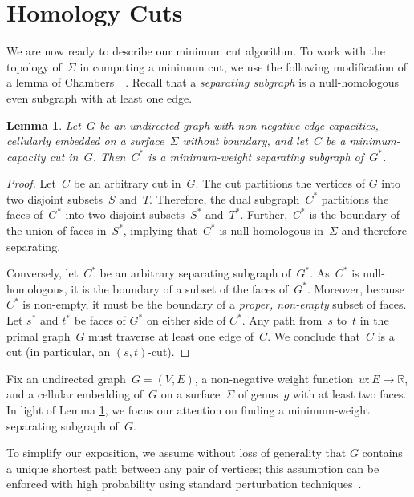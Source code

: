 \documentclass[twoside,leqno,twocolumn]{article}
\def\Real{\mathbb{R}}
\newtheorem{lemma}[theorem]{Lemma}
\begin{document}

\section{Homology Cuts}
\label{s:homology}

We are now ready to describe our minimum cut algorithm.  To work with the topology of~$\Sigma$ in computing a minimum cut, we use the following modification of a lemma of Chambers~\etal~\cite[Lemma~3.1]{cen-mcshc-09}.  Recall that a \emph{separating subgraph} is a null-homologous even subgraph with at least one edge.

\begin{lemma}
\label{L:mincut-z2}
Let~$G$ be an undirected graph with non-negative edge capacities, cellularly   embedded on a surface~$\Sigma$ without boundary, and let~$C$ be a minimum-capacity   cut in~$G$.  Then~$C^*$ is a minimum-weight separating subgraph of~$G^*$.
\end{lemma}

\begin{proof}
  Let~$C$ be an arbitrary cut in~$G$.  The cut partitions the vertices of $G$
  into two disjoint subsets~$S$ and~$T$. Therefore, the dual subgraph~$C^*$
  partitions the faces of~$G^*$ into two disjoint subsets~$S^*$ and~$T^*$.
  Further,~$C^*$ is the boundary of the union of faces in~$S^*$, implying
  that~$C^*$ is null-homologous in~$\Sigma$ and therefore separating.

  Conversely, let~$C^*$ be an arbitrary separating subgraph of~$G^*$.
  As~$C^*$ is null-homologous, it is the boundary of a subset of the faces
  of~$G^*$.  Moreover, because $C^*$ is non-empty, it must be the boundary of
  a \emph{proper, non-empty} subset of faces.  Let $s^*$ and $t^*$ be faces
  of $G^*$ on either side of $C^*$.  Any path from~$s$ to~$t$ in the primal
  graph~$G$ must traverse at least one edge of~$C$.  We conclude that~$C$ is
  a cut (in particular, an $(s,t)$-cut).
\end{proof}

Fix an undirected graph~$G=(V,E)$, a non-negative weight function~$w\colon E\to \Real$, and a cellular embedding of~$G$ on a surface~$\Sigma$ of genus~$g$ with at least two faces.  In light of Lemma \ref{L:mincut-z2}, we focus our attention on finding a minimum-weight separating subgraph of~$G$. 

To simplify our exposition, we assume without loss of generality that $G$ contains a unique shortest path between any pair of vertices; this assumption can be enforced with high probability using standard perturbation techniques~\cite{mvv-memi-87}.
\end{document}
